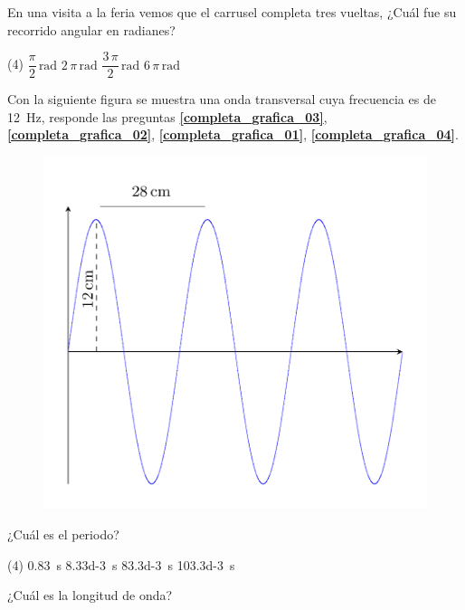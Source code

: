 \documentclass[12pt, letter]{exam}
\begin{document}


\newpage
\begin{questions}
    \question En una visita a la feria vemos que el carrusel completa tres vueltas, ¿Cuál fue su recorrido angular en radianes?
     \begin{tasks}(4)
         \task $\dfrac{\pi}{2} \, \unit{\radian}$
         \task $2 \,\pi \, \unit{\radian}$
         \task $\dfrac{3 \, \pi}{2} \, \unit{\radian}$
         \task $6 \, \pi \, \unit{\radian}$
     \end{tasks}
    Con la siguiente figura se muestra una onda transversal cuya frecuencia es de \SI{12}{\hertz}, responde las preguntas \textbf{\ref{completa_grafica_03}}, \textbf{\ref{completa_grafica_02}}, \textbf{\ref{completa_grafica_01}}, \textbf{\ref{completa_grafica_04}}.
    \begin{figure}[H]
        \centering
        \includegraphics[scale=0.3]{Imagenes/Grafica_Onda_Examen_01.png}
    \end{figure}
    \question \label{completa_grafica_03} ¿Cuál es el periodo?
    \begin{tasks}(4)
        \task \SI{0.83}{\second}
        \task \SI{8.33d-3}{\second}
        \task \SI{83.3d-3}{\second}
        \task \SI{103.3d-3}{\second}
    \end{tasks}
    \question \label{completa_grafica_02} ¿Cuál es la longitud de onda?

\end{questions}
\end{document}
